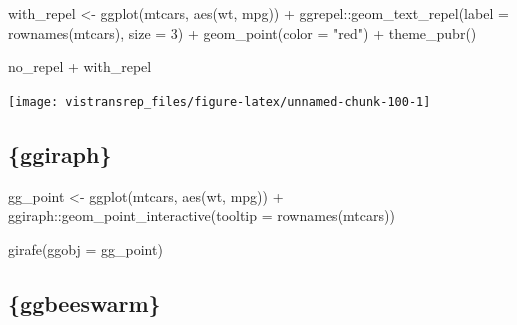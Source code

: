 \documentclass[]{book}
\newenvironment{Shaded}{}{}
\newcommand{\DataTypeTok}[1]{#1}
\newcommand{\DecValTok}[1]{#1}
\newcommand{\KeywordTok}[1]{\textcolor[rgb]{0.00,0.00,1.00}{#1}}
\newcommand{\NormalTok}[1]{#1}
\newcommand{\OperatorTok}[1]{#1}
\newcommand{\StringTok}[1]{\textcolor[rgb]{0.00,0.50,0.50}{#1}}
\begin{document}
\begin{Shaded}
\begin{Highlighting}[]
\NormalTok{with_repel <-}\StringTok{ }\KeywordTok{ggplot}\NormalTok{(mtcars, }\KeywordTok{aes}\NormalTok{(wt, mpg)) }\OperatorTok{+}
\StringTok{  }\NormalTok{ggrepel}\OperatorTok{::}\KeywordTok{geom_text_repel}\NormalTok{(}\DataTypeTok{label =} \KeywordTok{rownames}\NormalTok{(mtcars), }\DataTypeTok{size =} \DecValTok{3}\NormalTok{) }\OperatorTok{+}
\StringTok{  }\KeywordTok{geom_point}\NormalTok{(}\DataTypeTok{color =} \StringTok{"red"}\NormalTok{) }\OperatorTok{+}
\StringTok{  }\KeywordTok{theme_pubr}\NormalTok{()}
\end{Highlighting}
\end{Shaded}

\begin{Shaded}
\begin{Highlighting}[]
\NormalTok{no_repel }\OperatorTok{+}\StringTok{ }\NormalTok{with_repel}
\end{Highlighting}
\end{Shaded}

\begin{flushright}\texttt{[image: vistransrep\_files/figure-latex/unnamed-chunk-100-1]} \end{flushright}

\hypertarget{ggiraph}{%
\subsection{\{ggiraph\}}\label{ggiraph}}

\begin{Shaded}
\begin{Highlighting}[]
\NormalTok{gg_point <-}\StringTok{ }\KeywordTok{ggplot}\NormalTok{(mtcars, }\KeywordTok{aes}\NormalTok{(wt, mpg)) }\OperatorTok{+}
\StringTok{  }\NormalTok{ggiraph}\OperatorTok{::}\KeywordTok{geom_point_interactive}\NormalTok{(}\DataTypeTok{tooltip =} \KeywordTok{rownames}\NormalTok{(mtcars))}

\KeywordTok{girafe}\NormalTok{(}\DataTypeTok{ggobj =}\NormalTok{ gg_point)}
\end{Highlighting}
\end{Shaded}

\hypertarget{htmlwidget-63e63ac58891cc86e873}{}

\hypertarget{ggbeeswarm}{%
\subsection{\{ggbeeswarm\}}\label{ggbeeswarm}}
\end{document}
